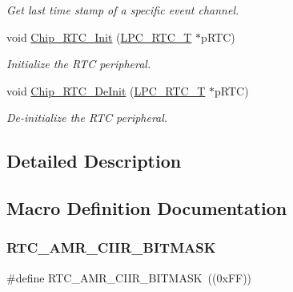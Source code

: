 \begin{DoxyCompactItemize}
\begin{DoxyCompactList}\small\item\em Get last time stamp of a specific event channel. \end{DoxyCompactList}\item 
void \hyperlink{group___r_t_c__18_x_x__43_x_x_gac37fe41fed088f1336797e05674125ff}{Chip\+\_\+\+R\+T\+C\+\_\+\+Init} (\hyperlink{struct_l_p_c___r_t_c___t}{L\+P\+C\+\_\+\+R\+T\+C\+\_\+T} $\ast$p\+R\+TC)
\begin{DoxyCompactList}\small\item\em Initialize the R\+TC peripheral. \end{DoxyCompactList}\item 
void \hyperlink{group___r_t_c__18_x_x__43_x_x_ga63cc16f1c4b72523e0e67a6c651f0026}{Chip\+\_\+\+R\+T\+C\+\_\+\+De\+Init} (\hyperlink{struct_l_p_c___r_t_c___t}{L\+P\+C\+\_\+\+R\+T\+C\+\_\+T} $\ast$p\+R\+TC)
\begin{DoxyCompactList}\small\item\em De-\/initialize the R\+TC peripheral. \end{DoxyCompactList}\end{DoxyCompactItemize}


\subsection{Detailed Description}


\subsection{Macro Definition Documentation}
\mbox{\label{group___r_t_c__18_x_x__43_x_x_gafcc754fba01521c5aa4f1775b889e894}} 
\subsubsection{\texorpdfstring{R\+T\+C\+\_\+\+A\+M\+R\+\_\+\+C\+I\+I\+R\+\_\+\+B\+I\+T\+M\+A\+SK}{RTC\_AMR\_CIIR\_BITMASK}}
{\footnotesize\ttfamily \#define R\+T\+C\+\_\+\+A\+M\+R\+\_\+\+C\+I\+I\+R\+\_\+\+B\+I\+T\+M\+A\+SK~((0x\+F\+F))}

